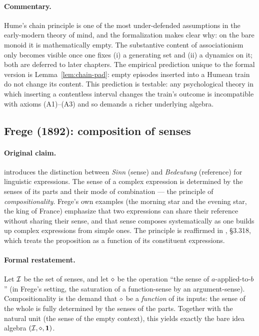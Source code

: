 \paragraph{Commentary.}
Hume's chain principle is one of the most under-defended assumptions in
the early-modern theory of mind, and the formalization makes clear why:
on the bare monoid it is mathematically empty.  The substantive content
of associationism only becomes visible once one fixes (i) a generating
set and (ii) a dynamics on it; both are deferred to later chapters.
The empirical prediction unique to the formal version is
Lemma~\ref{lem:chain-pad}: empty episodes inserted into a Humean train
do not change its content.  This prediction is testable: any
psychological theory in which inserting a contentless interval changes
the train's outcome is incompatible with axioms (A1)--(A3) and so
demands a richer underlying algebra.

\subsection*{Frege (1892): composition of senses}\label{zoo:frege}

\paragraph{Original claim.}
\cite{Frege1892} introduces the distinction between \emph{Sinn} (sense)
and \emph{Bedeutung} (reference) for linguistic expressions.  The sense of
a complex expression is determined by the senses of its parts and their
mode of combination --- the principle of \emph{compositionality}.  Frege's
own examples (the morning star and the evening star, the king of France)
emphasize that two expressions can share their reference without sharing
their sense, and that sense composes systematically as one builds up
complex expressions from simple ones.  The principle is reaffirmed in
\cite{Wittgenstein1922}, \S 3.318, which treats the proposition as a
function of its constituent expressions.

\paragraph{Formal restatement.}
Let $\mathcal{I}$ be the set of senses, and let $\mathbin{\diamond}$ be the operation
``the sense of $a$-applied-to-$b$'' (in Frege's setting, the saturation
of a function-sense by an argument-sense).  Compositionality is the
demand that $\mathbin{\diamond}$ be a \emph{function} of its inputs: the sense of
the whole is fully determined by the senses of the parts.  Together with
the natural unit (the sense of the empty context), this yields exactly
the bare idea algebra $(\mathcal{I},\mathbin{\diamond},\mathbf{1})$.

